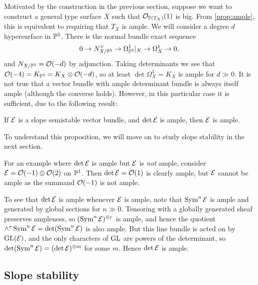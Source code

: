 Motivated by the construction in the previous section, suppose we want to
construct a general type surface $X$ such that $\O_{\P(T_X)}(1)$ is big. From
\cref{prop:ample}, this is equivalent to requiring that $T_X$ is ample. We will
consider a degree $d$ hypersurface in $\P^3$. There is the normal bundle exact
sequence
\begin{equation*}
    0 \to N_{X/\P^3}^\vee \to \Omega^1_{\P^3}|_X \to \Omega^1_X \to 0,
\end{equation*}
and $N_{X/\P^3}=\O(-d)$ by adjunction. Taking determinants we see that
$\O(-4)=K_{\P^3}=K_X\otimes\O(-d)$, so at least $\det\Omega^1_X=K_X$ is ample
for $d\gg0$. It is not true that a vector bundle with ample determinant bundle
is always itself ample (although the converse holds). However, in this
particular case it is sufficient, due to the following result:

\begin{proposition}\label{prop:stable ample}
    If $\calE$ is a slope semistable vector bundle, and $\det\calE$ is ample,
    then $\calE$ is ample.
\end{proposition}

To understand this proposition, we will move on to study slope stability in the
next section.

\begin{example}
    For an example where $\det\calE$ is ample but $\calE$ is \emph{not} ample,
    consider $\calE=\O(-1)\oplus\O(2)$ on $\P^1$. Then $\det\calE=\O(1)$ is
    clearly ample, but $\calE$ cannot be ample as the summand $\O(-1)$ is not
    ample.
\end{example}

\begin{remark}
    To see that $\det\calE$ is ample whenever $\calE$ is ample, note that
    $\Sym^n\calE$ is ample and generated by global sections for $n\gg0$.
    Tensoring with a globally generated sheaf preserves ampleness, so
    $(\Sym^n\calE)^{\otimes r}$ is ample, and hence the quotient
    $\wedge^r\Sym^n\calE=\det(\Sym^n\calE)$ is also ample. But this line bundle
    is acted on by $\GL(\calE)$, and the only characters of $\GL$ are powers of
    the determinant, so $\det(\Sym^n\calE)=(\det\calE)^{\otimes m}$ for some
    $m$. Hence $\det\calE$ is ample.
\end{remark}

\subsection{Slope stability}

